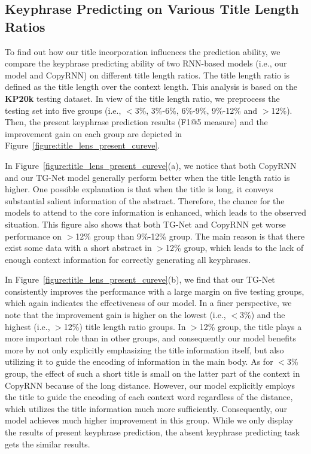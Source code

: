 \documentclass[letterpaper]{article} %
\begin{document}
\subsection{Keyphrase Predicting on Various Title Length Ratios}
To find out how our title incorporation influences the prediction ability, we compare the keyphrase predicting ability of two RNN-based models (i.e., our model and CopyRNN) on different title length ratios. The title length ratio is defined as the title length over the context length. This analysis is based on the \textbf{KP20k} testing dataset. In view of the title length ratio, we preprocess the testing set into five groups (i.e., $<$3\%, 3\%-6\%, 6\%-9\%, 9\%-12\% and $>$12\%). Then, the present keyphrase prediction results (F1@5 measure) and the improvement gain on each group are depicted in Figure~\ref{figure:title_lens_present_cureve}. 


In Figure~\ref{figure:title_lens_present_cureve}(a), we notice that both CopyRNN and our TG-Net model generally perform better when the title length ratio is higher. One possible explanation is that when the title is long, it conveys substantial salient information of the abstract. Therefore, the chance for the models to attend to the core information is enhanced, which leads to the observed situation. This figure also shows that both TG-Net and CopyRNN get worse performance on $>$12\% group than 9\%-12\% group. The main reason is that there exist some data with a short abstract in $>$12\% group, which leads to the lack of enough context information for correctly generating all keyphrases.


In Figure~\ref{figure:title_lens_present_cureve}(b), we find that our TG-Net consistently improves the performance with a large margin on five testing groups, which again indicates the effectiveness of our model. In a finer perspective, we note that the improvement gain is higher on the lowest (i.e., $<$3\%) and the highest (i.e., $>$12\%) title length ratio groups. In $>$12\% group, the title plays a more important role than in other groups, and consequently our model benefits more by not only explicitly emphasizing the title information itself, but also utilizing it to guide the encoding of information in the main body. As for $<$3\% group, the effect of such a short title is small on the latter part of the context in CopyRNN because of the long distance. However, our model explicitly employs the title to guide the encoding of each context word regardless of the distance, which utilizes the title information much more sufficiently. Consequently, our model achieves much higher improvement in this group. While we only display the results of present keyphrase prediction, the absent keyphrase predicting task gets the similar results. 
\end{document}
